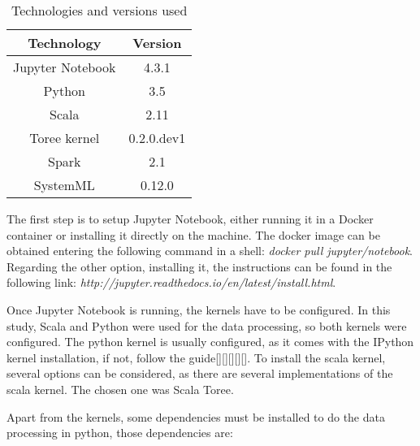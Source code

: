 \documentclass[11pt]{article} %
\begin{document}
    \begin{table}[!h]
      \centering
      \begin{tabular}{| c | c |}
        \hline

        Technology & Version \\ \hline
        Jupyter Notebook & 4.3.1 \\ \hline
        Python & 3.5 \\ \hline
        Scala & 2.11 \\ \hline
        Toree kernel & 0.2.0.dev1 \\ \hline
        Spark & 2.1 \\ \hline
        SystemML & 0.12.0 \\

        \hline
      \end{tabular}
      \caption{Technologies and versions used}
    \end{table}

    The first step is to setup Jupyter Notebook, either running it in a Docker container or installing it directly on the machine. The docker image can be obtained entering the following command in a shell: \emph{docker pull jupyter/notebook}. Regarding the other option, installing it, the instructions can be found in the following link: \emph{http://jupyter.readthedocs.io/en/latest/install.html}.

    Once Jupyter Notebook is running, the kernels have to be configured. In this study, Scala and Python were used for the data processing, so both kernels were configured. The python kernel is usually configured, as it comes with the IPython kernel installation, if not, follow the guide[][][][][]. To install the scala kernel, several options can be considered, as there are several implementations of the scala kernel. The chosen one was Scala Toree.

    Apart from the kernels, some dependencies must be installed to do the data processing in python, those dependencies are:
\end{document}

